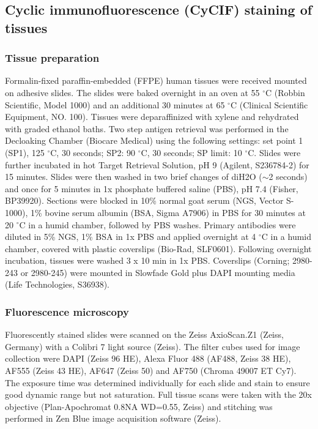 \documentclass[preprint,review,3p,12pt]{elsarticle}
\begin{document}
\subsection{Cyclic immunofluorescence (CyCIF) staining of tissues}
\subsubsection{Tissue preparation}
Formalin-fixed paraffin-embedded (FFPE) human tissues were received mounted on adhesive slides. The slides were baked overnight in an oven at 55 $^\circ$C (Robbin Scientific, Model 1000) and an additional 30 minutes at 65 $^\circ$C (Clinical Scientific Equipment, NO. 100). Tissues were deparaffinized with xylene and rehydrated with graded ethanol baths. Two step antigen retrieval was performed in the Decloaking Chamber (Biocare Medical) using the following settings: set point 1 (SP1), 125 $^\circ$C, 30 seconds; SP2: 90 $^\circ$C, 30 seconds; SP limit: 10 $^\circ$C. Slides were further incubated in hot Target Retrieval Solution, pH 9 (Agilent, S236784-2) for 15 minutes. Slides were then washed in two brief changes of diH2O ($\sim$2 seconds) and once for 5 minutes in 1x phosphate buffered saline (PBS), pH 7.4 (Fisher, BP39920). Sections were blocked in 10\% normal goat serum (NGS, Vector S-1000), 1\% bovine serum albumin (BSA, Sigma A7906) in PBS for 30 minutes at 20 $^\circ$C in a humid chamber, followed by PBS washes. Primary antibodies were diluted in 5\% NGS, 1\% BSA in 1x PBS and applied overnight at 4 $^\circ$C in a humid chamber, covered with plastic coverslips (Bio-Rad, SLF0601). Following overnight incubation, tissues were washed 3 x 10 min in 1x PBS. Coverslips (Corning; 2980-243 or 2980-245) were mounted in Slowfade Gold plus DAPI mounting media (Life Technologies, S36938).


\subsubsection{Fluorescence microscopy}
Fluorescently stained slides were scanned on the Zeiss AxioScan.Z1 (Zeiss, Germany) with a Colibri 7 light source (Zeiss). The filter cubes used for image collection were DAPI (Zeiss 96 HE), Alexa Fluor 488 (AF488, Zeiss 38 HE), AF555 (Zeiss 43 HE), AF647 (Zeiss 50) and AF750 (Chroma 49007 ET Cy7). The exposure time was determined individually for each slide and stain to ensure good dynamic range but not saturation. Full tissue scans were taken with the 20x objective (Plan-Apochromat 0.8NA WD=0.55, Zeiss) and stitching was performed in Zen Blue image acquisition software (Zeiss).
\end{document}

